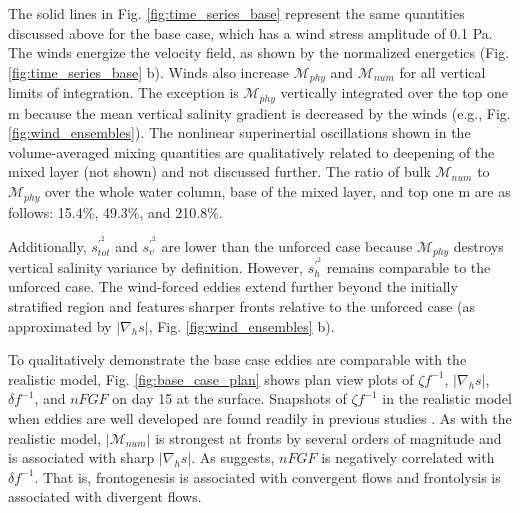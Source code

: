 The solid lines in Fig. \ref{fig:time_series_base} represent the same quantities discussed above for the base case, which has a wind stress amplitude of 0.1 Pa. The winds energize the velocity field, as shown by the normalized energetics (Fig. \ref{fig:time_series_base} b). Winds also increase $\mathcal{M}_{phy}$ and $\mathcal{M}_{num}$ for all vertical limits of integration. The exception is $\mathcal{M}_{phy}$ vertically integrated over the top one m because the mean vertical salinity gradient is decreased by the winds (e.g., Fig.  \ref{fig:wind_ensembles}). The nonlinear superinertial oscillations shown in the volume-averaged mixing quantities are qualitatively related to deepening of the mixed layer (not shown) and not discussed further. The ratio of bulk $\mathcal{M}_{num}$ to $\mathcal{M}_{phy}$ over the whole water column, base of the mixed layer, and top one m are as follows: 15.4\%, 49.3\%, and 210.8\%. 

Additionally, $s_{tot}^{\prime^2}$ and $s_{v}^{\prime^2}$ are lower than the unforced case because $\mathcal{M}_{phy}$ destroys vertical salinity variance by definition. However, $s_{h}^{\prime^2}$ remains comparable to the unforced case. The wind-forced eddies extend further beyond the initially stratified region and features sharper fronts relative to the unforced case (as approximated by $|\nabla_h s|$, Fig. \ref{fig:wind_ensembles} b).

To qualitatively demonstrate the base case eddies are comparable with the realistic model, Fig. \ref{fig:base_case_plan} shows plan view plots of $\zeta f^{-1}$, $|\nabla_h s|$, $\delta f^{-1}$, and $nFGF$ on day 15 at the surface. Snapshots of $\zeta f^{-1}$ in the realistic model when eddies are well developed are found readily in previous studies \citep{Hetland_2017, Kobashi_2020, Qu_2022_NIW}. As with the realistic model, $|\mathcal{M}_{num}|$ is strongest at fronts by several orders of magnitude and is associated with sharp $|\nabla_h s|$. As \citet{barkan2019role} suggests, $nFGF$ is negatively correlated with $\delta f^{-1}$. That is, frontogenesis is associated with convergent flows and frontolysis is associated with divergent flows.

